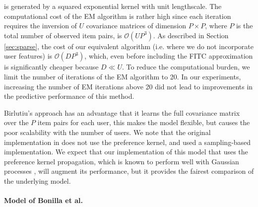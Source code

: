 is generated by a squared exponential kernel with unit lengthscale. 
The computational cost of the EM algorithm is rather high
since each iteration requires the inversion of $U$ covariance matrices of dimension $P \times P$,
where $P$ is the total number of observed item pairs, is $\mathcal{O}(UP^3)$.
As described in Section \ref{sec:sparse}, the cost of our equivalent algorithm 
(i.e. where we do not incorporate user features) is $\mathcal{O}(DP^3)$, which, even before
including the FITC approximation is significantly cheaper because $D\ll U$.
To reduce the computational burden, we limit
the number of iterations of the EM algorithm to 20. In our experiments, increasing the number of EM iterations 
above 20 did not lead to improvements in the predictive performance of this method.

Birlutiu's approach has an advantage that it learns the full covariance matrix
over the $P$ item pairs for each user, this makes the model flexible,
but causes the poor scalability with the number of users.
We note that the original implementation in \citep{birlutiu2009} does not
use the preference kernel, and used a sampling-based implementation.
We expect that our implementation of this model that uses
the preference kernel
propagation, which is known to perform well with Gaussian processes \citep{nickisch2008},
will augment its performance, but it provides the fairest comparison of 
the underlying model.

\paragraph{Model of Bonilla et al.}

